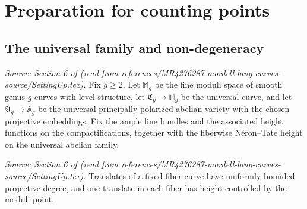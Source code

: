 \section{Preparation for counting points}

\subsection{The universal family and non-degeneracy}

\begin{definition}
  \label{def:ambient_setup}
  \textit{Source: Section 6 of \cite{MR4276287-mordell-lang-curves} (read from references/MR4276287-mordell-lang-curves-source/SettingUp.tex).}
  Fix \(g \ge 2\). Let \(\mathbb{M}_g\) be the fine moduli space of smooth
  genus-\(g\) curves with level structure, let \(\mathfrak{C}_g \to \mathbb{M}_g\)
  be the universal curve, and let \(\mathfrak{A}_g \to \mathbb{A}_g\) be the
  universal principally polarized abelian variety with the chosen projective
  embeddings. Fix the ample line bundles and the associated height functions on
  the compactifications, together with the fiberwise Néron--Tate height on the
  universal abelian family.
\end{definition}

\begin{lemma}
  \label{lem:uniform_degree_bound}
  \textit{Source: Section 6 of \cite{MR4276287-mordell-lang-curves} (read from references/MR4276287-mordell-lang-curves-source/SettingUp.tex).}
  Translates of a fixed fiber curve have uniformly bounded projective degree, and
  one translate in each fiber has height controlled by the moduli point.
\end{lemma}

